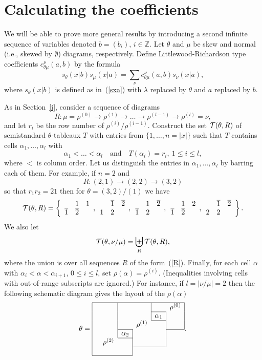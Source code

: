 \documentclass[titlepage,12pt]{article}
\newcommand{\barr}{\begin{array}}
\newcommand{\earr}{\end{array}}
\newcommand{\beq}{\begin{equation}}
\newcommand{\eeq}{\end{equation}}
\newcommand{\mc}[3]{\multicolumn{#1}{#2}{#3}}
\newcommand{\Mc}[1]{\multicolumn{#1}{c}{}}
\newcommand{\ol}{\overline}
\newcommand{\qmq}[1]{\quad\mbox{#1}\quad}
\newcommand{\emp}{\emptyset}
\newcommand{\al}{\alpha}
\newcommand{\la}{\lambda}
\renewcommand{\th}{\theta}
\newcommand{\0}{{\bf 0}}
\newcommand{\1}{{\bf 1}}
\newcommand{\2}{{\bf 2}}
\newcommand{\3}{{\bf 3}}
\newcommand{\4}{{\bf 4}}
\newcommand{\5}{{\bf 5}}
\newcommand{\6}{{\bf 6}}
\newcommand{\7}{{\bf 7}}
\newcommand{\8}{{\bf 8}}
\newcommand{\9}{{\bf 9}}
\newcommand{\cT}{{\cal T}}
\newcommand{\ZZ}{\mathbb{Z}}
\begin{document}
\section{Calculating the coefficients}			\label{cc}

We will be able to prove more general results by introducing a second
infinite sequence of variables 
denoted $b=(b_i)$, $i\in\ZZ$.  Let $\theta$ and $\mu$ be skew and
normal (i.e., skewed by $\emp$) diagrams, respectively.
Define Littlewood-Richardson type coefficients $c_{\theta\mu}^{\nu}(a,b)$
by the formula
\beq						\label{cab}
s_{\theta}(x|b)s_{\mu}(x|a)=
\sum_{\nu} c_{\theta\mu}^{\nu}(a,b) s_{\nu}(x|a),
\eeq
where $s_{\theta}(x|b)$ is defined as in~(\ref{sxa}) with $\la$
replaced by $\th$ and $a$ replaced by $b$.

As in Section~\ref{i}, consider a sequence of diagrams
\beq							\label{R}
R:\mu=\rho^{(0)}\to\rho^{(1)}\to
\ldots\to\rho^{(l-1)}\to\rho^{(l)}=\nu,
\eeq
and let $r_i$ be the row number of $\rho^{(i)}/\rho^{(i-1)}$.
Construct the set $\cT(\theta,R)$ of semistandard $\theta$-tableaux
$T$ with entries from $\{1,\ldots,n=|x|\}$ such that $T$ contains
cells $\al_1,\ldots,\al_l$ with
$$
\al_1<\ldots<\al_l\qmq{and}T(\al_i)=r_i,\ 1\le i\le l,
$$
where $<$ is column order.
Let us distinguish the entries in $\al_1,\dots,\al_l$ by barring
each of them.  For example, if $n=2$ and
$$
R:(2,1)\to(2,2)\to(3,2)
$$
so that $r_1r_2=21$ then for $\th=(3,2)/(1)$ we have
$$
\cT(\th,R)=\left\{
\barr{ccc}
	&1	&1\\
\ol{1}	&\ol{2}
\earr,
\barr{ccc}
	&\ol{1}	&\ol{2}\\
1	&2
\earr,
\barr{ccc}
	&1	&\ol{2}\\
\ol{1}	&2
\earr,
\barr{ccc}
	&1	&2\\
\ol{1}	&\ol{2}
\earr,
\barr{ccc}
	&\ol{1}	&\ol{2}\\
2	&2
\earr
\right\}.
$$
We also let
$$
\cT(\th,\nu/\mu)=\biguplus_R \cT(\th,R),
$$
where the union is over all sequences $R$ of the form~(\ref{R}).
Finally, for each cell $\alpha$ with $\al_i<\al<\al_{i+1}$,
$0\le i\le l$, set $\rho(\alpha)=\rho^{(i)}$.  (Inequalities involving
cells with out-of-range subscripts are ignored.)  For instance, if
$l=|\nu/\mu|=2$ then the following schematic diagram gives the layout of
the $\rho(\al)$
$$
\th=
\barr{|cc|c|c|c|c|} \hline
&	&\Mc{1}	&		&\Mc{1}	&\rho^{(0)}\\	\cline{5-5}
&	&\Mc{1}	&		&\al_1	&	\\	\cline{5-5}
&	&\Mc{1}	&\mc{1}{c}{\rho^{(1)}}&	&     	\\ 	\cline{3-3}\cline{6-6}
&	&\al_2	&\Mc{1}		&	\\	\cline{3-3}
&\mc{1}{c}{\rho^{(2)}}&&\Mc{1}	&	\\	\cline{4-5}
&\Mc{1}	&	\\	\cline{1-3}
\earr.
$$
\end{document}

